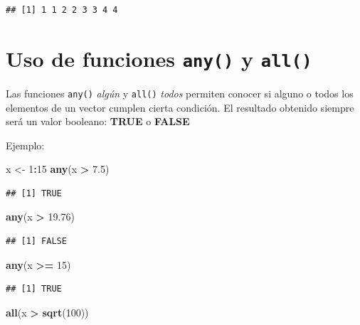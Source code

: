 \documentclass[
]{book}
\newenvironment{Shaded}{\begin{snugshade}}{\end{snugshade}}
\newcommand{\DecValTok}[1]{\textcolor[rgb]{0.00,0.00,0.81}{#1}}
\newcommand{\FloatTok}[1]{\textcolor[rgb]{0.00,0.00,0.81}{#1}}
\newcommand{\FunctionTok}[1]{\textcolor[rgb]{0.13,0.29,0.53}{\textbf{#1}}}
\newcommand{\NormalTok}[1]{#1}
\newcommand{\OtherTok}[1]{\textcolor[rgb]{0.56,0.35,0.01}{#1}}
\newcommand{\SpecialCharTok}[1]{\textcolor[rgb]{0.81,0.36,0.00}{\textbf{#1}}}
\begin{document}
\begin{verbatim}
## [1] 1 1 2 2 3 3 4 4
\end{verbatim}

\section{\texorpdfstring{Uso de funciones \texttt{any()} y \texttt{all()}}{Uso de funciones any() y all()}}\label{uso-de-funciones-any-y-all}

Las funciones \texttt{any()} \emph{algún} y \texttt{all()} \emph{todos} permiten conocer si alguno o todos los elementos de un vector cumplen cierta condición.
El resultado obtenido siempre será un valor booleano: \textbf{TRUE} o \textbf{FALSE}

Ejemplo:

\begin{Shaded}
\begin{Highlighting}[]
\NormalTok{x }\OtherTok{\textless{}{-}} \DecValTok{1}\SpecialCharTok{:}\DecValTok{15}
\FunctionTok{any}\NormalTok{(x }\SpecialCharTok{\textgreater{}} \FloatTok{7.5}\NormalTok{)}
\end{Highlighting}
\end{Shaded}

\begin{verbatim}
## [1] TRUE
\end{verbatim}

\begin{Shaded}
\begin{Highlighting}[]
\FunctionTok{any}\NormalTok{(x }\SpecialCharTok{\textgreater{}} \FloatTok{19.76}\NormalTok{)}
\end{Highlighting}
\end{Shaded}

\begin{verbatim}
## [1] FALSE
\end{verbatim}

\begin{Shaded}
\begin{Highlighting}[]
\FunctionTok{any}\NormalTok{(x }\SpecialCharTok{\textgreater{}=} \DecValTok{15}\NormalTok{)}
\end{Highlighting}
\end{Shaded}

\begin{verbatim}
## [1] TRUE
\end{verbatim}

\begin{Shaded}
\begin{Highlighting}[]
\FunctionTok{all}\NormalTok{(x }\SpecialCharTok{\textgreater{}} \FunctionTok{sqrt}\NormalTok{(}\DecValTok{100}\NormalTok{))}
\end{Highlighting}
\end{Shaded}
\end{document}
